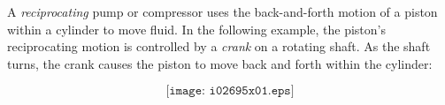 

A {\it reciprocating} pump or compressor uses the back-and-forth motion of a piston within a cylinder to move fluid.  In the following example, the piston's reciprocating motion is controlled by a {\it crank} on a rotating shaft.  As the shaft turns, the crank causes the piston to move back and forth within the cylinder:

$$\texttt{[image: i02695x01.eps]}$$







 










